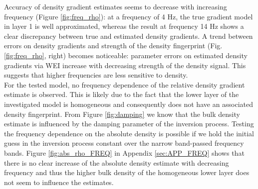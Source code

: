\documentclass{article}
\begin{document}
	
	
	Accuracy of density gradient estimates seems to decrease with increasing frequency (Figure \ref{fig:freq_rho}): at a frequency of 4 Hz, the true gradient model in layer 1 is well approximated, whereas the result at frequency 14 Hz shows a clear discrepancy between true and estimated density gradients. 
	A  trend between errors on density gradients and strength of the density fingerprint (Fig. \ref{fig:freq_rho}, right) becomes noticeable: parameter errors on estimated density gradients via WEI increase with decreasing strength of the density signal. This suggests that higher frequencies are less sensitive to density.\\
	
	For the tested model, no frequency dependence of the relative density gradient estimate is observed. This is likely due to the fact that the lower layer of the investigated model is homogeneous and consequently does not have an associated density fingerprint. From Figure \ref{fig:damping} we know that the bulk density estimate is influenced by the damping parameter of the inversion process. Testing the frequency dependence on the absolute density is possible if we hold the initial guess in the inversion process constant over the narrow band-passed frequency bands. Figure \ref{fig:abs_rho_FREQ} in Appendix \ref{sec:APP_FREQ} shows that there is no clear increase of the absolute density estimate with decreasing frequency and thus the higher bulk density of the homogeneous lower layer does not seem to influence the estimates.
	  
\end{document}
